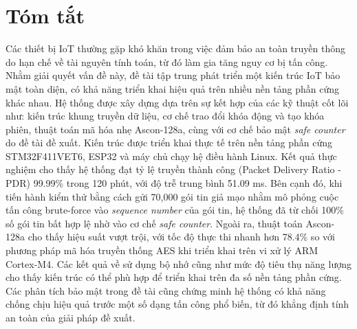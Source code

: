 \chapter*{Tóm tắt}
\label{Abstract}

Các thiết bị IoT thường gặp khó khăn trong việc đảm bảo an toàn truyền thông do hạn chế về tài nguyên tính toán, từ đó làm gia tăng nguy cơ bị tấn công. Nhằm giải quyết vấn đề này, đề tài tập trung phát triển một kiến trúc IoT bảo mật toàn diện, có khả năng triển khai hiệu quả trên nhiều nền tảng phần cứng khác nhau.
Hệ thống được xây dựng dựa trên sự kết hợp của các kỹ thuật cốt lõi như: kiến trúc khung truyền dữ liệu, cơ chế trao đổi khóa động và tạo khóa phiên, thuật toán mã hóa nhẹ Ascon-128a, cùng với cơ chế bảo mật \textit{safe counter} do đề tài đề xuất. Kiến trúc được triển khai thực tế trên nền tảng phần cứng STM32F411VET6, ESP32 và máy chủ chạy hệ điều hành Linux.
Kết quả thực nghiệm cho thấy hệ thống đạt tỷ lệ truyền thành công (Packet Delivery Ratio - PDR) 99.99\% trong 120 phút, với độ trễ trung bình 51.09 ms. Bên cạnh đó, khi tiến hành kiểm thử bằng cách gửi 70,000 gói tin giả mạo nhằm mô phỏng cuộc tấn công brute-force vào \textit{sequence number} của gói tin, hệ thống đã từ chối 100\% số gói tin bất hợp lệ nhờ vào cơ chế \textit{safe counter}. Ngoài ra, thuật toán Ascon-128a cho thấy hiệu suất vượt trội, với tốc độ thực thi nhanh hơn 78.4\% so với phương pháp mã hóa truyền thống AES khi triển khai trên vi xử lý ARM Cortex-M4.
Các kết quả về sử dụng bộ nhớ cũng như mức độ tiêu thụ năng lượng cho thấy kiến trúc có thể phù hợp để triển khai trên đa số nền tảng phần cứng. 
Các phân tích bảo mật trong đề tài cũng chứng minh hệ thống có khả năng chống chịu hiệu quả trước một số dạng tấn công phổ biến, từ đó khẳng định tính an toàn của giải pháp đề xuất.